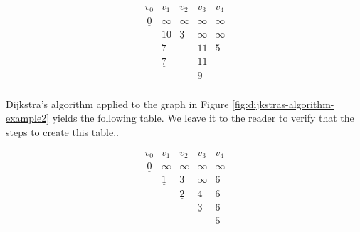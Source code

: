 \begin{example}
{\[
\begin{array}{ccccc}
v_0  & v_1  & v_2     &  v_3     & v_4  \\\
\underline{0}    & \infty & \infty & \infty & \infty \\
      & 10      & \underline{3}        & \infty & \infty \\
      &  7       &            &  11     & \underline{5}       \\
      &  \underline{7}       &            &  11     &         \\
      &          &            &   \underline{9}     &         \\
\end{array}
\]

}
\end{example}

\begin{exercise}
{\rm
Dijkstra's algorithm applied to the graph in Figure
\ref{fig:dijkstras-algorithm-example2} yields the following
table. We leave it to the reader to verify that 
the steps to create this table..



\[
\begin{array}{ccccc}
v_0  & v_1  & v_2     &  v_3     & v_4  \\\
\underline{0}    & \infty & \infty & \infty & \infty \\
      & \underline{1}      & 3        & \infty & 6 \\
      &     &    \underline{2}    &  4     &    6       \\
      &     &                            &  \underline{3}     &   6      \\
      &          &            &           & \underline{5}  \\
\end{array}
\]
}
\end{exercise}

